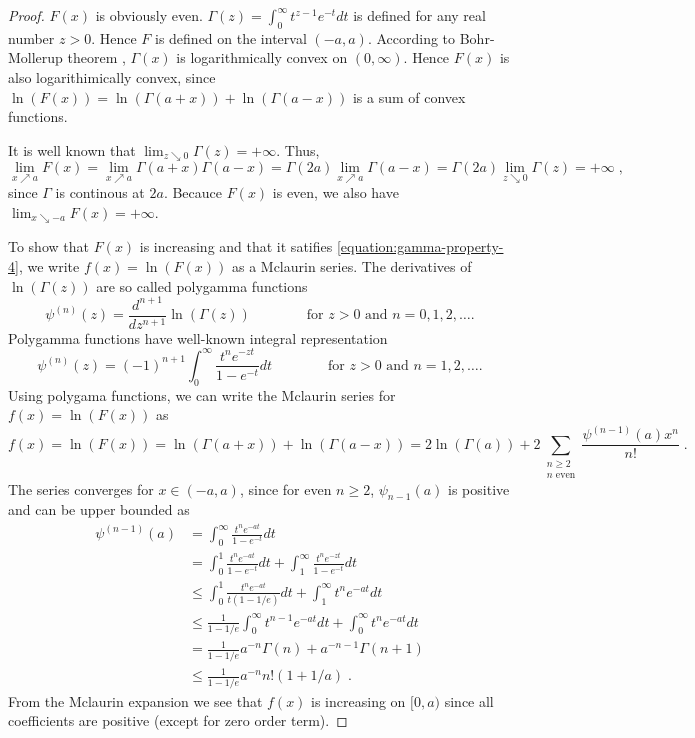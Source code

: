 \begin{proof}
$F(x)$ is obviously even. $\Gamma(z) = \int_0^\infty t^{z-1} e^{-t} dt$ is
defined for any real number $z > 0$. Hence $F$ is defined on the interval
$(-a,a)$. According to Bohr-Mollerup theorem \cite[Theorem 2.1]{Artin64},
$\Gamma(x)$ is logarithmically convex on $(0,\infty)$. Hence $F(x)$ is also
logarithimically convex, since $\ln (F(x)) = \ln(\Gamma(a+x)) +
\ln(\Gamma(a-x))$ is a sum of convex functions.

It is well known that $\lim_{z \searrow 0} \Gamma(z) = +\infty$. Thus,
$$
\lim_{x \nearrow a} F(x)
= \lim_{x \nearrow a} \Gamma(a+x) \Gamma(a-x)
= \Gamma(2a) \lim_{x \nearrow a} \Gamma(a-x)
= \Gamma(2a) \lim_{z \searrow 0} \Gamma(z)
= + \infty \; ,
$$
since $\Gamma$ is continous at $2a$. Becauce $F(x)$ is even, we also have
$\lim_{x \searrow -a} F(x) = +\infty$.

To show that $F(x)$ is increasing and that it satifies
\eqref{equation:gamma-property-4}, we write $f(x) = \ln(F(x))$ as a Mclaurin series.
The derivatives of $\ln(\Gamma(z))$ are so called polygamma functions
$$
\psi^{(n)}(z) = \frac{d^{n+1}}{dz^{n+1}} \ln(\Gamma(z))
\qquad \qquad \text{for $z > 0$ and $n=0,1,2,\dots$.}
$$
Polygamma functions have well-known integral representation
$$
\psi^{(n)}(z) = (-1)^{n+1} \int_0^\infty \frac{t^n e^{-zt}}{1 - e^{-t}} dt
\qquad \qquad \text{for $z > 0$ and $n=1,2,\dots$.}
$$
Using polygama functions, we can write the Mclaurin series for $f(x) = \ln(F(x))$ as
$$
f(x) = \ln(F(x)) = \ln(\Gamma(a+x)) + \ln(\Gamma(a-x)) = 2 \ln(\Gamma(a)) + 2 \sum_{\substack{n \ge 2 \\ \text{$n$ even}}} \frac{\psi^{(n-1)}(a) x^n}{n!} \; .
$$
The series converges for $x \in (-a,a)$, since
for even $n \ge 2$, $\psi_{n-1}(a)$ is positive and can be upper bounded as
\begin{align*}
\psi^{(n-1)}(a)
& = \int_0^\infty \frac{t^n e^{-at}}{1 - e^{-t}} dt \\
& = \int_0^1 \frac{t^n e^{-at}}{1 - e^{-t}} dt + \int_1^\infty \frac{t^n e^{-zt}}{1 - e^{-t}} dt \\
& \le \int_0^1 \frac{t^n e^{-at}}{t(1 - 1/e)} dt + \int_1^\infty t^n e^{-at} dt \\
& \le \frac{1}{1 - 1/e} \int_0^\infty t^{n-1} e^{-at} dt + \int_0^\infty t^n e^{-at} dt \\
& = \frac{1}{1 - 1/e} a^{-n} \Gamma(n) + a^{-n-1} \Gamma(n+1) \\
& \le \frac{1}{1 - 1/e} a^{-n} n! (1 + 1/a) \; .
\end{align*}
From the Mclaurin expansion we see that $f(x)$ is increasing on $[0,a)$
since all coefficients are positive (except for zero order term).


\end{proof}
